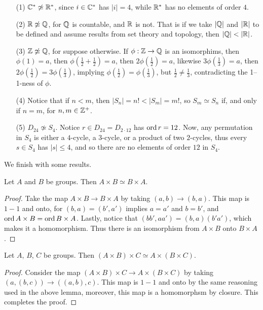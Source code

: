 \begin{example}\label{example_1.15}
  \begin{enumerate}
    \item[(1)] $\mathbb{C}^* \not\simeq \mathbb{R}^*$, since $i \in \mathbb{C}^*$ has $|i|=4$,
      while $\mathbb{R}^*$ has no elements of order  $4$.

    \item [(2)] $\mathbb{R} \not\simeq \mathbb{Q}$, for  $\mathbb{Q}$ is countable, and  $\mathbb{R}$ is
      not. That is if we take  $|\mathbb{Q}|$ and $|\mathbb{R}|$ to be defined and
      assume results from set theory and topology, then $|\Q|<|\R|$.

    \item[(3)] $\mathbb{Z} \not\simeq \mathbb{Q}$, for suppose otherwise. If  $\phi:\mathbb{Z}
      \rightarrow \mathbb{Q}$ is an isomorphims, then $\phi(1)=a$, then
      $\phi(\frac{1}{2}+\frac{1}{2})=a$, then $2\phi(\frac{1}{2})=a$,
      likewise $3\phi(\frac{1}{3})=a$, then $2\phi(\frac{1}{2})=
      3\phi(\frac{1}{3})$, implying $\phi(\frac{1}{2})=\phi(\frac{1}{3})$,
      but $\frac{1}{2} \neq \frac{1}{3}$, contradicting the 1--1-ness of
      $\phi$.

    \item[(4)] Notice that if $n<m$, then  $|S_n|=n!<|S_m|=m!$, so
      $S_m \simeq S_n$ if, and only if  $n=m$, for $n,m \in \mathbb{Z}^+$.

    \item[(5)] $D_{24} \not\simeq S_4$. Notice $r \in D_{24}=D_{2 \cdot 12}$
      has $\operatorname{ord}{r}=12$. Now, any permutation in $S_4$ is either a
      $4$-cycle, a  $3$-cycle, or a product of two  $2$-cycles, thus every
      $s \in S_4$ has $|s| \leq 4$, and so there are no elements of
      order $12$ in  $S_4$.
  \end{enumerate}
\end{example}

We finish with some results.

\begin{lemma}\label{lemma_1.5.5}
  Let $A$ and  $B$ be groups. Then  $A \times B \simeq B \times A$.
\end{lemma}
\begin{proof}
  Take the map $A \times B \rightarrow B \times A$ by taking $(a,b)
  \rightarrow (b,a)$. This map is $1-1$ and onto, for $(b,a)=(b',a')$ implies
  $a=a'$ and  $b=b'$, and  $\operatorname{ord}{A \times B}=\operatorname{ord}{B \times A}$. Lastly,
  notice that $(bb',aa')=(b,a)(b'a')$, which makes it a homomorphism. Thus
  there is an isomorphism from  $A \times B$ onto  $B \times A$.
\end{proof}

\begin{lemma}\label{lemma_1.5.7}
  Let $A$,  $B$,  $C$ be groups. Then  $(A \times B) \times C \simeq A \times
  (B \times C)$.
\end{lemma}
\begin{proof}
  Consider the map $(A \times B) \times C \rightarrow A \times (B \times C)$
  by taking $(a,(b,c)) \rightarrow ((a,b),c)$. This map is $1-1$ and onto by
  the same reasoning used in the above lemma, moreover, this map is a
  homomorphsm by closure. This completes the proof.
\end{proof}
